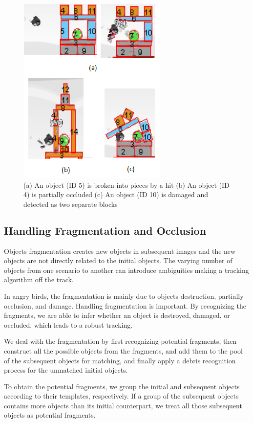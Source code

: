 \documentclass[letterpaper]{article}
\begin{document}
\begin{figure}[h!]
\centering\includegraphics[scale=0.7]{Fragmentation.png}\caption{(a) An object (ID 5) is broken into pieces by a hit (b) An object (ID 4) is partially occluded (c) An object (ID 10) is damaged and detected as two separate blocks}
\label{Fragments}
\end{figure}

\subsection{Handling Fragmentation and Occlusion}

Objects fragmentation creates new objects in subsequent images and the new objects are not directly related to the initial objects. The varying number of objects from one scenario to another can introduce ambiguities making a tracking algorithm off the track. 

In angry birds, the fragmentation is mainly due to objects destruction, partially occlusion, and damage. Handling fragmentation is important. By recognizing the fragments, we are able to infer whether an object is destroyed, damaged, or occluded, which leads to a robust tracking.

We deal with the fragmentation by first recognizing potential fragments, then construct all the possible objects from the fragments, and add them to the pool of the subsequent objects for matching, and finally apply a debris recognition process for the unmatched initial objects. 

To obtain the potential fragments, we group the initial and subsequent objects according to their templates, respectively. If a group of the subsequent objects contains more objects than its initial counterpart, we treat all those subsequent objects as potential fragments.  
\end{document}
